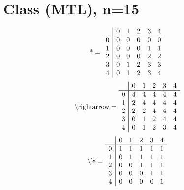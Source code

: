 \documentclass[11pt]{article}
\begin{document}
\section{Class (MTL), n=15}
\[\text{*} = 
\begin{array}{r | r r r r r}
 & 0 & 1 & 2 & 3 & 4 \\ \hline
0 & 0 & 0 & 0 & 0 & 0 \\
1 & 0 & 0 & 0 & 1 & 1 \\
2 & 0 & 0 & 0 & 2 & 2 \\
3 & 0 & 1 & 2 & 3 & 3 \\
4 & 0 & 1 & 2 & 3 & 4 \\
\end{array}
\]
\[\text{\textbackslash rightarrow} = 
\begin{array}{r | r r r r r}
 & 0 & 1 & 2 & 3 & 4 \\ \hline
0 & 4 & 4 & 4 & 4 & 4 \\
1 & 2 & 4 & 4 & 4 & 4 \\
2 & 2 & 2 & 4 & 4 & 4 \\
3 & 0 & 1 & 2 & 4 & 4 \\
4 & 0 & 1 & 2 & 3 & 4 \\
\end{array}
\]
\[\text{\textbackslash le} = 
\begin{array}{r | r r r r r}
 & 0 & 1 & 2 & 3 & 4 \\ \hline
0 & 1 & 1 & 1 & 1 & 1 \\
1 & 0 & 1 & 1 & 1 & 1 \\
2 & 0 & 0 & 1 & 1 & 1 \\
3 & 0 & 0 & 0 & 1 & 1 \\
4 & 0 & 0 & 0 & 0 & 1 \\
\end{array}
\]
\end{document}
